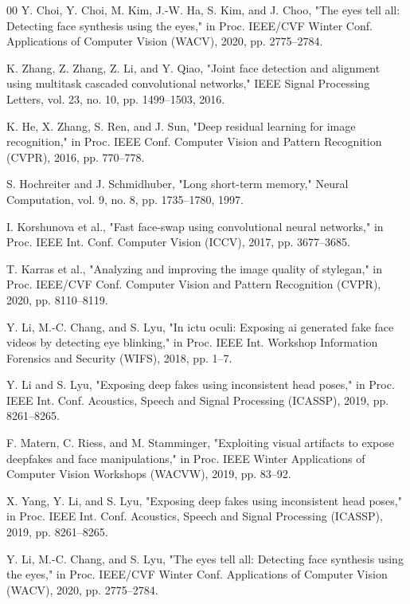 \documentclass[conference]{IEEEtran}
\begin{document}
\begin{thebibliography}{00}
 Y. Choi, Y. Choi, M. Kim, J.-W. Ha, S. Kim, and J. Choo, "The eyes tell all: Detecting face synthesis using the eyes," in Proc. IEEE/CVF Winter Conf. Applications of Computer Vision (WACV), 2020, pp. 2775–2784.

 K. Zhang, Z. Zhang, Z. Li, and Y. Qiao, "Joint face detection and alignment using multitask cascaded convolutional networks," IEEE Signal Processing Letters, vol. 23, no. 10, pp. 1499–1503, 2016.

 K. He, X. Zhang, S. Ren, and J. Sun, "Deep residual learning for image recognition," in Proc. IEEE Conf. Computer Vision and Pattern Recognition (CVPR), 2016, pp. 770–778.

 S. Hochreiter and J. Schmidhuber, "Long short-term memory," Neural Computation, vol. 9, no. 8, pp. 1735–1780, 1997.

 I. Korshunova et al., "Fast face-swap using convolutional neural networks," in Proc. IEEE Int. Conf. Computer Vision (ICCV), 2017, pp. 3677–3685.

 T. Karras et al., "Analyzing and improving the image quality of stylegan," in Proc. IEEE/CVF Conf. Computer Vision and Pattern Recognition (CVPR), 2020, pp. 8110–8119.

 Y. Li, M.-C. Chang, and S. Lyu, "In ictu oculi: Exposing ai generated fake face videos by detecting eye blinking," in Proc. IEEE Int. Workshop Information Forensics and Security (WIFS), 2018, pp. 1–7.

 Y. Li and S. Lyu, "Exposing deep fakes using inconsistent head poses," in Proc. IEEE Int. Conf. Acoustics, Speech and Signal Processing (ICASSP), 2019, pp. 8261–8265.

 F. Matern, C. Riess, and M. Stamminger, "Exploiting visual artifacts to expose deepfakes and face manipulations," in Proc. IEEE Winter Applications of Computer Vision Workshops (WACVW), 2019, pp. 83–92.

 X. Yang, Y. Li, and S. Lyu, "Exposing deep fakes using inconsistent head poses," in Proc. IEEE Int. Conf. Acoustics, Speech and Signal Processing (ICASSP), 2019, pp. 8261–8265.

 Y. Li, M.-C. Chang, and S. Lyu, "The eyes tell all: Detecting face synthesis using the eyes," in Proc. IEEE/CVF Winter Conf. Applications of Computer Vision (WACV), 2020, pp. 2775–2784.


\end{thebibliography}
\end{document}

